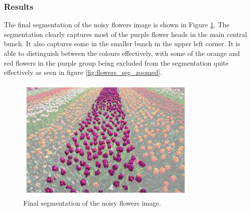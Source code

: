 \documentclass[11pt]{article}
\begin{document}
\subsubsection{Results}
The final segmentation of the noisy flowers image is shown in Figure \ref{fig:q1b_final_mask}. The segmentation clearly captures most of the purple flower heads in the main central bunch. It also captures some in the smaller bunch in the upper left corner. It is able to distinguish between the colours effectively, with some of the orange and red flowers in the purple group being excluded from the segmentation quite effectively as seen in figure \ref{fig:flowers_seg_zoomed}.

\begin{figure}[H]
    \centering
    \includegraphics[width=0.8\textwidth]{figs/q1b_final_mask.png}
    \caption{Final segmentation of the noisy flowers image.}
    \label{fig:q1b_final_mask}
\end{figure}
\end{document}
